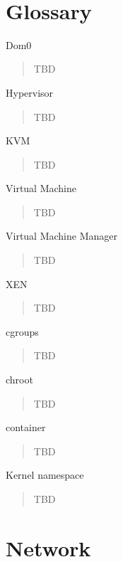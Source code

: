 \MDNAME\

\section{Glossary}

Dom0

\begin{quote}
TBD
\end{quote}

Hypervisor

\begin{quote}
TBD
\end{quote}

KVM

\begin{quote}
TBD
\end{quote}

Virtual Machine

\begin{quote}
TBD
\end{quote}

Virtual Machine Manager

\begin{quote}
TBD
\end{quote}

XEN

\begin{quote}
TBD
\end{quote}

cgroups

\begin{quote}
TBD
\end{quote}

chroot

\begin{quote}
TBD
\end{quote}

container

\begin{quote}
TBD
\end{quote}

Kernel namespace

\begin{quote}
TBD
\end{quote}

\section{Network}


